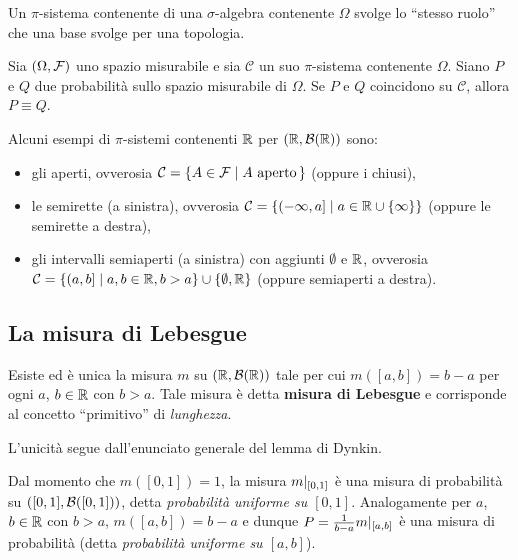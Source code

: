 \begin{multicols*}{2}
\begin{remark}
    Un $\pi$-sistema contenente di una $\sigma$-algebra contenente $\Omega$ svolge lo ``stesso ruolo'' che una
    base svolge per una topologia.
\end{remark}

\begin{lemma}
    Sia $(\Omega, \mathcal{F})$ uno spazio misurabile e sia $\mathcal{C}$ un suo $\pi$-sistema contenente
    $\Omega$. Siano
    $P$ e $Q$ due probabilità sullo spazio misurabile di $\Omega$. Se $P$ e $Q$ coincidono su
    $\mathcal{C}$, allora $P \equiv Q$.
\end{lemma}

\begin{example}
    Alcuni esempi di $\pi$-sistemi contenenti $\mathbb{R}$ per $(\mathbb{R}, \mathcal{B}(\mathbb{R}))$ sono:
    \begin{itemize}
        \item gli aperti, ovverosia $\mathcal{C} = \{ A \in \mathcal{F} \mid A \text{ aperto}\, \}$ (oppure i chiusi),
        \item le semirette (a sinistra), ovverosia $\mathcal{C} = \{ (-\infty, a] \mid a \in \mathbb{R} \cup \{\infty\} \}$ (oppure le semirette a destra),
        \item gli intervalli semiaperti (a sinistra) con aggiunti $\emptyset$ e $\mathbb{R}$, ovverosia $\mathcal{C} = \{ (a, b] \mid a, b \in \mathbb{R}, b > a \} \cup \{\emptyset, \mathbb{R}\}$ (oppure semiaperti a destra).
    \end{itemize}
\end{example}

\subsection{La misura di Lebesgue}

\begin{theorem}
    Esiste ed è unica la misura $m$ su $(\mathbb{R}, \mathcal{B}(\mathbb{R}))$ tale per cui
    $m([a, b]) = b-a$ per ogni $a$, $b \in \mathbb{R}$ con $b > a$. Tale misura
    è detta \textbf{misura di Lebesgue} e corrisponde al concetto ``primitivo'' di
    \textit{lunghezza}. \smallskip


    L'unicità segue dall'enunciato generale del lemma di Dynkin.
\end{theorem}

\begin{remark}
    Dal momento che $m([0, 1]) = 1$,
    la misura $m\arrowvert_{[0,1]}$ è una misura di probabilità su $([0,1], \mathcal{B}([0, 1]))$,
    detta \textit{probabilità uniforme su $[0,1]$}. Analogamente per $a$, $b \in \mathbb{R}$
    con $b > a$, $m([a, b]) = b-a$ e
    dunque $P = \frac{1}{b-a} m\arrowvert_{[a,b]}$ è una misura di probabilità (detta
    \textit{probabilità uniforme su $[a,b]$}). \smallskip



\end{remark}
\end{multicols*}
